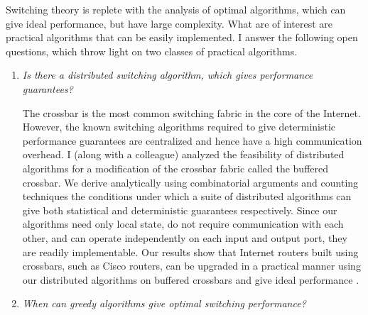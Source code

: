 \documentclass[a4paper, 10pt]{article}
\begin{document}
\begin{small}
Switching theory is replete with the analysis of optimal algorithms, which can give 
ideal performance, but have large complexity. What are of interest are practical algorithms that can 
be easily implemented. I answer the following open questions, which throw light on two classes of 
practical algorithms.

\begin{enumerate}
\item {\em Is there a distributed switching algorithm, which gives performance guarantees?}


The crossbar is the most common switching fabric in the core of the Internet. However,
the known switching algorithms required to give deterministic performance 
guarantees are centralized and hence have a high communication overhead.
I (along with a colleague) analyzed the feasibility of distributed algorithms for a
modification of the crossbar fabric called the buffered crossbar.
We derive analytically using combinatorial arguments and counting techniques the
conditions under which a suite of distributed algorithms can give 
both statistical and deterministic
guarantees respectively. 
Since our algorithms need only local state, do not require communication with each other, 
and can operate independently on each input and output port, they are readily implementable.
Our results show that Internet routers built using crossbars, such as Cisco routers, can 
be upgraded in a practical manner using our distributed 
algorithms on buffered crossbars and give ideal performance \cite{buffxbar}.


\item {\em When can greedy algorithms give optimal switching performance?}


\end{enumerate}
\end{small}
\end{document}
